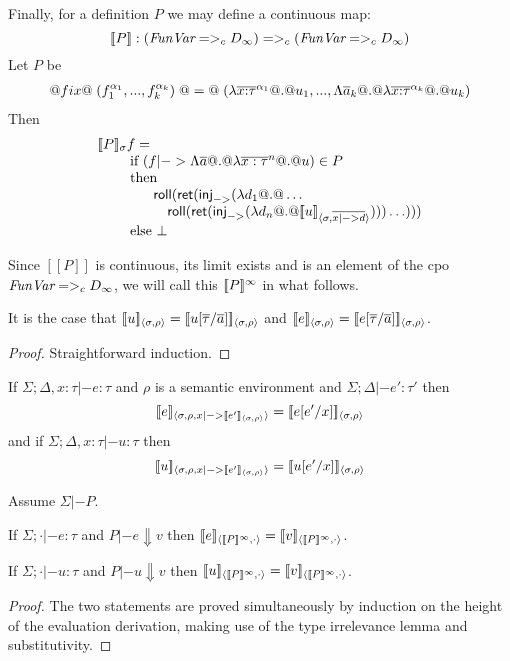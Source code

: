\documentclass[preprint,nocopyrightspace,draft]{sigplanconf}
\begin{document}
Finally, for a definition $P$ we may define a continuous map:
\[ 
        [\![P]\!] : (\textit{FunVar} =>_c D_{\infty}) =>_c (\textit{FunVar} =>_c D_{\infty}) 
\]
Let $P$ be 
\[\begin{array}{l} 
     @fix@\;(f_1^{\alpha_1},...,f_k^{\alpha_k})\;@=@\; 
     (\lambda{\overline{x{:}\tau}^{\alpha_1}} @.@ u_1,...,
                   \Lambda\overline{a}_k @.@ \lambda{\overline{x{:}\tau}^{\alpha_k}} @.@ u_k) 
\end{array}\] 
Then
\[\begin{array}{l}  
   [\![P]\!]_{\sigma} f =  \\ 
     \qquad\mbox{ if } (f |-> \Lambda\overline{a} @.@ \lambda\overline{x:\tau}^{n} @.@ u) \in P \\
     \qquad\mbox{ then } \\
     \qquad\quad\quad \mathsf{roll}(\mathsf{ret}(\mathsf{inj}_{->}(\mathsf{\lambda} d_1 @.@ \ldots  \\
     \qquad\quad\quad\quad \mathsf{roll}(\mathsf{ret}(\mathsf{inj}_{->}(\mathsf{\lambda} d_n @.@ [\![u]\!]_{\langle {\sigma},{\overline{x |-> d}}\rangle})))\ldots))) \\
     \qquad \mbox{ else } \bot
\end{array}\]

Since $[\![P]\!]$ is continuous, its limit exists and is an element of the cpo $\textit{FunVar} =>_c D_{\infty}$, 
we will call this $[\![P]\!]^{\infty}$ in what follows.


\begin{lemma}
It is the case that $[\![u]\!]_{\langle {\sigma},{\rho}\rangle} = [\![u[\overline{\tau}/\overline{a}]]\!]_{\langle {\sigma},{\rho}\rangle}$ 
and $[\![e]\!]_{\langle {\sigma},{\rho}\rangle} = [\![e[\overline{\tau}/\overline{a}]]\!]_{\langle {\sigma},{\rho}\rangle}$.
\end{lemma}
\begin{proof} Straightforward induction. \end{proof}

\begin{lemma}[Substitutivity]
If $\Sigma;\Delta,x{:}\tau |- e : \tau$ and $\rho$ is a semantic environment 
and $\Sigma;\Delta |- e' : \tau'$ then 
\[ [\![e]\!]_{\langle {\sigma},{\rho,x |-> [\![e']\!]_{\langle {\sigma},{\rho}\rangle}}\rangle} = [\![e[e'/x]]\!]_{\langle {\sigma},{\rho}\rangle} \]
and if $\Sigma;\Delta,x{:}\tau |- u : \tau$ then 
\[ [\![u]\!]_{\langle {\sigma},{\rho,x |-> [\![e']\!]_{\langle {\sigma},{\rho}\rangle}}\rangle} = [\![u[e'/x]]\!]_{\langle {\sigma},{\rho}\rangle} \]
\end{lemma}

\begin{lemma}
Assume $\Sigma |- P$. 
\begin{itemize*} 
  \item If $\Sigma;\cdot |- e : \tau$ and $P |- e \Downarrow v$ then $\interp{e}{\dbrace{P}^{\infty}}{\cdot} = \interp{v}{\dbrace{P}^{\infty}}{\cdot}$.
  \item If $\Sigma;\cdot |- u : \tau$ and $P |- u \Downarrow v$ then $\interp{u}{\dbrace{P}^{\infty}}{\cdot} = \interp{v}{\dbrace{P}^{\infty}}{\cdot}$.
\end{itemize*} 
\end{lemma} 
\begin{proof} The two statements are proved simultaneously by induction on the height of the evaluation derivation, making use
of the type irrelevance lemma and substitutivity.
\end{proof}
\end{document}
